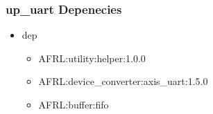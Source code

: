 \subsubsection{up\_uart Depenecies}
\begin{itemize}
\item dep
	\begin{itemize}
	\item AFRL:utility:helper:1.0.0
	\item AFRL:device\_converter:axis\_uart:1.5.0
	\item AFRL:buffer:fifo
	\end{itemize}
\end{itemize}
